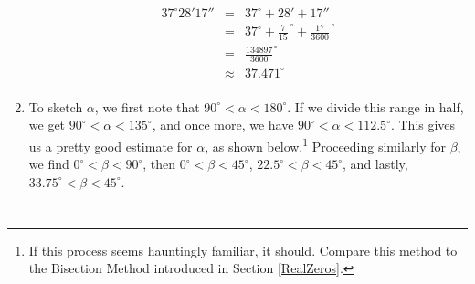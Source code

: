 \documentclass[12pt]{ximera}
\begin{document}
\begin{example}
\begin{enumerate}
\[ \begin{array}{rcl}

 37^{\circ}28'17'' & = & 37^{\circ} + 28' + 17'' \\ [5pt]
                   & = & 37^{\circ} +  \frac{7}{15}^{\, \circ} + \frac{17}{3600}^{\, \circ} \\ [5pt]
                   & = & \frac{134897}{3600}^{\circ} \\ [5pt]
                   & \approx & 37.471^{\circ} \\ \end{array} \]

\item  To sketch $\alpha$, we first note that $90^{\circ} < \alpha < 180^{\circ}$.  If we divide this range in half, we get $90^{\circ} < \alpha < 135^{\circ}$, and once more, we have $90^{\circ} < \alpha < 112.5^{\circ}$.  This gives us a pretty good estimate for $\alpha$, as shown below.\footnote{If this process seems hauntingly familiar, it should. Compare this method to the Bisection Method introduced in Section \ref{RealZeros}.}  Proceeding similarly for $\beta$, we find $0^{\circ} < \beta < 90^{\circ}$, then $0^{\circ} < \beta < 45^{\circ}$, $22.5^{\circ} < \beta < 45^{\circ}$, and lastly, $33.75^{\circ} < \beta < 45^{\circ}$.  

\[ \begin{array}{cc}

 

&

\hspace{1in}

  \\ \end{array} \]


\end{enumerate}
\end{example}
\end{document}
